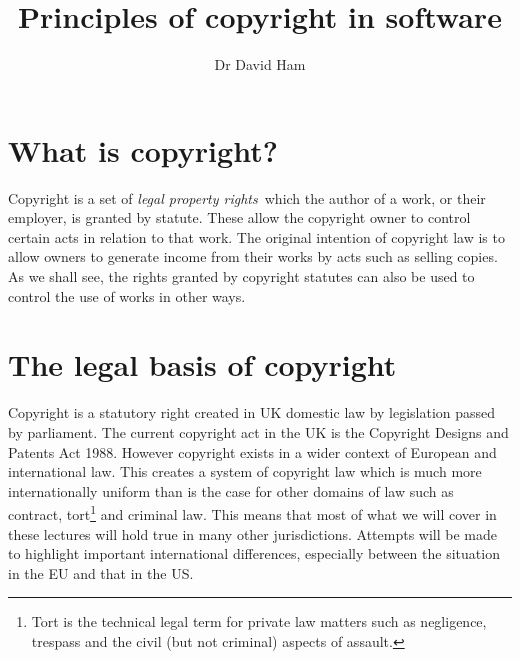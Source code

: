 \documentclass[a4paper,12pt]{article}
\begin{document}
\title{Principles of copyright in software}

\author{Dr David Ham}

\renewcommand{\today}{24 May 2013}

\maketitle

\section{What is copyright?}

Copyright is a set of \emph{legal property rights}\ which the author of a work, or
their employer, is granted by statute. These allow the copyright owner to
control certain acts in relation to that work. The original intention of copyright
law is to allow owners to generate income from their works by acts such as
selling copies. As we shall see, the rights granted by copyright statutes
can also be used to control the use of works in other ways.

\section{The legal basis of copyright}

Copyright is a statutory right created in UK domestic law by legislation
passed by parliament. The current copyright act in the UK is the Copyright
Designs and Patents Act 1988. However copyright exists in a wider context of
European and international law. This creates a system of copyright law which
is much more internationally uniform than is the case for other domains of
law such as contract, tort\footnote{Tort is the technical legal term for
  private law matters such as negligence, trespass and the civil (but not
  criminal) aspects of assault.} and criminal law. This means that most of
what we will cover in these lectures will hold true in many other
jurisdictions. Attempts will be made to highlight important international
differences, especially between the situation in the EU and that in the US.
\end{document}
